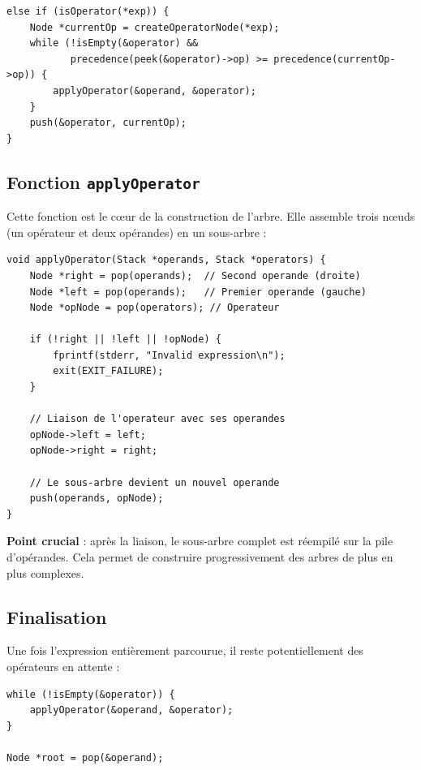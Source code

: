\documentclass[12pt,a4paper]{article}
\begin{document}
\begin{lstlisting}[caption={Traitement des opérateurs}]
else if (isOperator(*exp)) {
    Node *currentOp = createOperatorNode(*exp);
    while (!isEmpty(&operator) &&
           precedence(peek(&operator)->op) >= precedence(currentOp->op)) {
        applyOperator(&operand, &operator);
    }
    push(&operator, currentOp);
}
\end{lstlisting}

\subsection{Fonction \texttt{applyOperator}}

Cette fonction est le cœur de la construction de l'arbre. Elle assemble trois nœuds (un opérateur et deux opérandes) en un sous-arbre :

\begin{lstlisting}[caption={Construction d'un sous-arbre}]
void applyOperator(Stack *operands, Stack *operators) {
    Node *right = pop(operands);  // Second operande (droite)
    Node *left = pop(operands);   // Premier operande (gauche)
    Node *opNode = pop(operators); // Operateur

    if (!right || !left || !opNode) {
        fprintf(stderr, "Invalid expression\n");
        exit(EXIT_FAILURE);
    }

    // Liaison de l'operateur avec ses operandes
    opNode->left = left;
    opNode->right = right;

    // Le sous-arbre devient un nouvel operande
    push(operands, opNode);
}
\end{lstlisting}

\textbf{Point crucial} : après la liaison, le sous-arbre complet est réempilé sur la pile d'opérandes. Cela permet de construire progressivement des arbres de plus en plus complexes.

\subsection{Finalisation}

Une fois l'expression entièrement parcourue, il reste potentiellement des opérateurs en attente :

\begin{lstlisting}[caption={Traitement des opérateurs restants}]
while (!isEmpty(&operator)) {
    applyOperator(&operand, &operator);
}

Node *root = pop(&operand);
\end{lstlisting}
\end{document}
